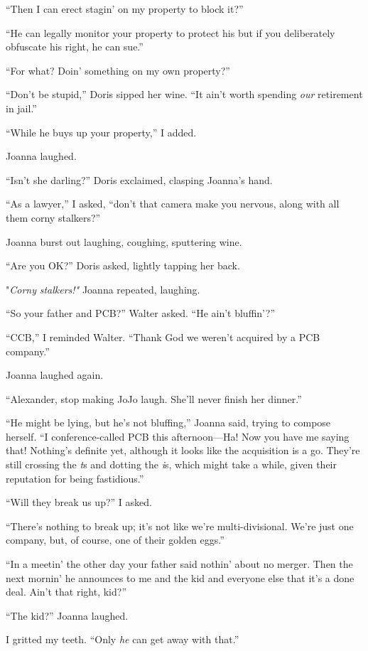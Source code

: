 ``Then I can erect stagin' on my property to block it?''

``He can legally monitor your property to protect his but if you
deliberately obfuscate his right, he can sue.''

``For what? Doin' something on my own property?''

``Don't be stupid,'' Doris sipped her wine. ``It ain't worth spending
\emph{our} retirement in jail.''

``While he buys up your property,'' I added.

Joanna laughed.

``Isn't she darling?'' Doris exclaimed, clasping Joanna's hand.

``As a lawyer,'' I asked, ``don't that camera make you nervous, along
with all them corny stalkers?''

Joanna burst out laughing, coughing, sputtering wine.

``Are you OK?'' Doris asked, lightly tapping her back.

"\emph{Corny} \emph{stalkers!"} Joanna repeated, laughing.

``So your father and PCB?'' Walter asked. ``He ain't bluffin'?''

``CCB,'' I reminded Walter. ``Thank God we weren't acquired by a PCB
company.''

Joanna laughed again.

``Alexander, stop making JoJo laugh. She'll never finish her dinner.''

``He might be lying, but he's not bluffing,'' Joanna said, trying to
compose herself. ``I conference-called PCB this afternoon---Ha! Now you
have me saying that! Nothing's definite yet, although it looks like the
acquisition is a go. They're still crossing the \emph{t}s and dotting
the \emph{i}s, which might take a while, given their reputation for
being fastidious.''

``Will they break us up?'' I asked.

``There's nothing to break up; it's not like we're multi-divisional.
We're just one company, but, of course, one of their golden eggs.''

``In a meetin' the other day your father said nothin' about no merger.
Then the next mornin' he announces to me and the kid and everyone else
that it's a done deal. Ain't that right, kid?''

``The kid?'' Joanna laughed.

I gritted my teeth. ``Only \emph{he} can get away with that.''

